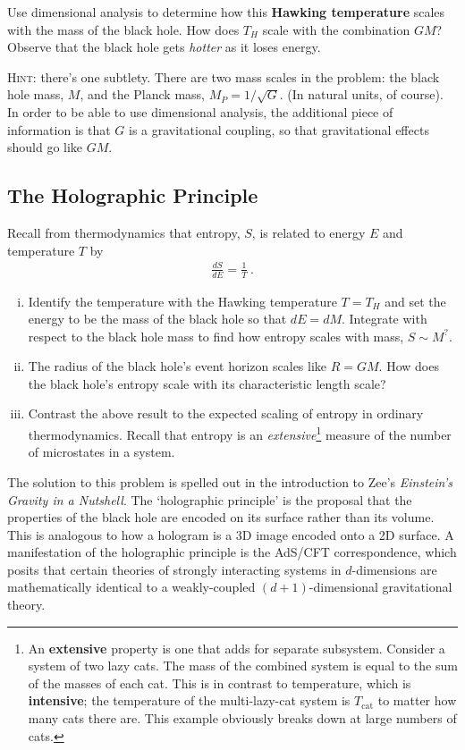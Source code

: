 \documentclass[12pt]{article}
\numberwithin{equation}{section}    %
\begin{document}
Use dimensional analysis to determine how this \textbf{Hawking temperature} scales with the mass of the black hole. How does $T_H$ scale with the combination $GM$? Observe that the black hole gets \emph{hotter} as it loses energy.


\textsc{Hint}: there's one subtlety. There are two mass scales in the problem: the black hole mass, $M$, and the Planck mass, $M_P = 1/\sqrt{G}$. (In natural units, of course). In order to be able to use dimensional analysis, the additional piece of information is that $G$ is a gravitational coupling, so that gravitational effects should go like $GM$. 


\subsection{The Holographic Principle}

Recall from thermodynamics that entropy, $S$, is related to energy $E$ and temperature $T$ by
\begin{align}
	\frac{dS}{dE} = \frac{1}{T} \ .
\end{align}
\begin{enumerate}[(i)]
	\item Identify the temperature with the Hawking temperature $T=T_H$ and set the energy to be the mass of the black hole so that $dE = dM$. Integrate with respect to the black hole mass to find how entropy scales with mass, $S \sim M^?$.
	\item The radius of the black hole's event horizon scales like $R = GM$. How does the black hole's entropy scale with its characteristic length scale? 
	\item Contrast the above result to the expected scaling of entropy in ordinary thermodynamics. Recall that entropy is an \emph{extensive}\footnote{An \textbf{extensive} property is one that adds for separate subsystem. Consider a system of two lazy cats. The mass of the combined system is equal to the sum of the masses of each cat. This is in contrast to temperature, which is \textbf{intensive}; the temperature of the multi-lazy-cat system is $T_\text{cat}$ to matter how many cats there are. This example obviously breaks down at large numbers of cats.} measure of the number of microstates in a system.
\end{enumerate}

The solution to this problem is spelled out in  the introduction to Zee's \emph{Einstein's Gravity in a Nutshell}. The `holographic principle' is the proposal that the properties of the black hole are encoded on its surface rather than its volume. This is analogous to how a hologram is a 3D image encoded onto a 2D surface. A manifestation of the holographic principle is the AdS/CFT correspondence, which posits that certain theories of strongly interacting systems in $d$-dimensions are mathematically identical to a weakly-coupled $(d+1)$-dimensional gravitational theory.
\end{document}

